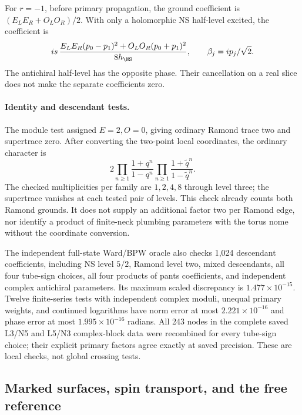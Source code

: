 For $r=-1$, before primary propagation, the ground coefficient is
$(E_LE_R+O_LO_R)/2$. With only a holomorphic NS half-level excited,
the coefficient is
\begin{equation}
 is\,\frac{E_LE_R(p_0-p_1)^2+O_LO_R(p_0+p_1)^2}
                {8h_{\NS}},\qquad \beta_j=ip_j/\sqrt2.
 \label{eq:partition-half-level}
\end{equation}
The antichiral half-level has the opposite phase. Their cancellation
on a real slice does not make the separate coefficients zero.

\paragraph{Identity and descendant tests.}
The module test assigned $E=2,O=0$, giving ordinary Ramond trace two and
supertrace zero. After converting the two-point local coordinates,
the ordinary character is
\begin{equation}
 2\prod_{n\geq1}\frac{1+q^n}{1-q^n}
  \prod_{n\geq1}\frac{1+\widetilde q^n}{1-\widetilde q^n}.
 \label{eq:partition-character}
\end{equation}
The checked multiplicities per family are $1,2,4,8$ through level
three; the supertrace vanishes at each tested pair of levels.
This check already counts both Ramond grounds. It does not supply
an additional factor two per Ramond edge, nor identify a product
of finite-neck plumbing parameters with the torus nome without
the coordinate conversion.

The independent full-state Ward/BPW oracle also checks 1,024
descendant coefficients, including NS level $5/2$, Ramond level
two, mixed descendants, all four tube-sign choices, all four
products of pants coefficients, and independent complex antichiral
parameters. Its maximum scaled discrepancy is $1.477\times10^{-15}$.
Twelve finite-series tests with independent complex moduli,
unequal primary weights, and continued logarithms have norm error
at most $2.221\times10^{-16}$ and phase error at most
$1.995\times10^{-16}$ radians. All 243 nodes in the complete
saved L3/N5 and L5/N3 complex-block data were recombined for every
tube-sign choice; their explicit primary factors agree exactly
at saved precision. These are local checks, not global crossing
tests.

\subsection{Marked surfaces, spin transport, and the free reference}


